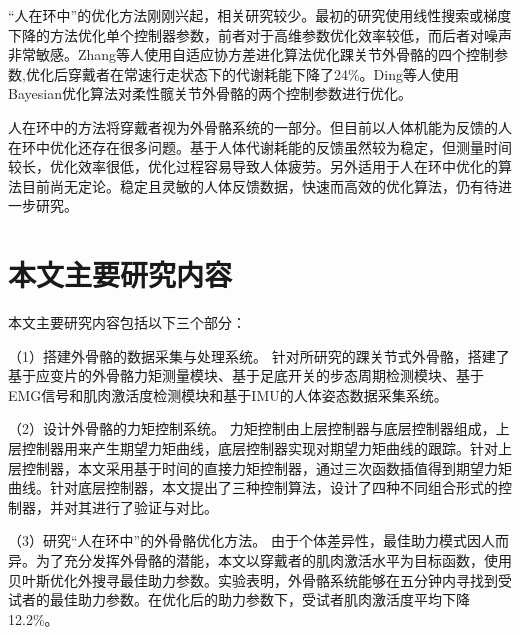 “人在环中”的优化方法刚刚兴起，相关研究较少。最初的研究使用线性搜索\cite{p38}或梯度下降\cite{p39}的方法优化单个控制器参数，前者对于高维参数优化效率较低，而后者对噪声非常敏感。Zhang等人\cite{p40}使用自适应协方差进化算法优化踝关节外骨骼的四个控制参数,优化后穿戴者在常速行走状态下的代谢耗能下降了24\%。Ding等人\cite{p41}使用Bayesian优化算法对柔性髋关节外骨骼的两个控制参数进行优化。

人在环中的方法将穿戴者视为外骨骼系统的一部分。但目前以人体机能为反馈的人在环中优化还存在很多问题。基于人体代谢耗能的反馈虽然较为稳定，但测量时间较长，优化效率很低，优化过程容易导致人体疲劳。另外适用于人在环中优化的算法目前尚无定论。稳定且灵敏的人体反馈数据，快速而高效的优化算法，仍有待进一步研究。

\section{本文主要研究内容}

本文主要研究内容包括以下三个部分：

（1）搭建外骨骼的数据采集与处理系统。
针对所研究的踝关节式外骨骼，搭建了基于应变片的外骨骼力矩测量模块、基于足底开关的步态周期检测模块、基于EMG信号和肌肉激活度检测模块和基于IMU的人体姿态数据采集系统。

（2）设计外骨骼的力矩控制系统。
力矩控制由上层控制器与底层控制器组成，上层控制器用来产生期望力矩曲线，底层控制器实现对期望力矩曲线的跟踪。针对上层控制器，本文采用基于时间的直接力矩控制器，通过三次函数插值得到期望力矩曲线。针对底层控制器，本文提出了三种控制算法，设计了四种不同组合形式的控制器，并对其进行了验证与对比。

（3）研究“人在环中”的外骨骼优化方法。
由于个体差异性，最佳助力模式因人而异。为了充分发挥外骨骼的潜能，本文以穿戴者的肌肉激活水平为目标函数，使用贝叶斯优化外搜寻最佳助力参数。实验表明，外骨骼系统能够在五分钟内寻找到受试者的最佳助力参数。在优化后的助力参数下，受试者肌肉激活度平均下降12.2\%。